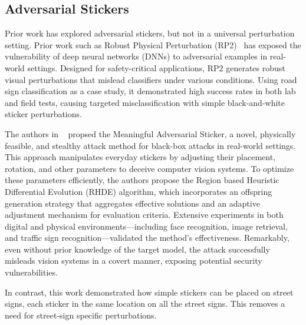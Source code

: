 \subsection{Adversarial Stickers}

Prior work has explored adversarial stickers, but not in a universal perturbation setting. Prior work such as Robust Physical Perturbation (RP2)~\cite{eykholt2018robust} has exposed the vulnerability of deep neural networks (DNNs) to adversarial examples in real-world settings. Designed for safety-critical applications, RP2 generates robust visual perturbations that mislead classifiers under various conditions. Using road sign classification as a case study, it demonstrated high success rates in both lab and field tests, causing targeted misclassification with simple black-and-white sticker perturbations.

The authors in ~\cite{9779913} propsed the Meaningful Adversarial Sticker, a novel, physically feasible, and stealthy attack method for black-box attacks in real-world settings. This approach manipulates everyday stickers by adjusting their placement, rotation, and other parameters to deceive computer vision systems. To optimize these parameters efficiently, the authors propose the  Region based Heuristic Differential Evolution (RHDE) algorithm, which incorporates an offspring generation strategy that aggregates effective solutions and an adaptive adjustment mechanism for evaluation criteria. Extensive experiments in both digital and physical environments—including face recognition, image retrieval, and traffic sign recognition—validated the method’s effectiveness. Remarkably, even without prior knowledge of the target model, the attack successfully misleads vision systems in a covert manner, exposing potential security vulnerabilities.

In contrast, this work demonstrated how simple stickers can be placed on street signs, each sticker in the same location on all the street signs. This removes a need for street-sign specific perturbations.